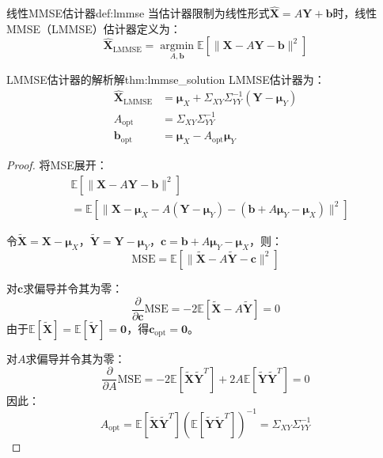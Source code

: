 \documentclass[11pt]{article}
\renewcommand{\vec}[1]{\bm{#1}}
\newcommand{\E}{\mathbb{E}}
\newcommand{\argmin}{\operatorname*{argmin}}
\begin{document}
\begin{definition}{线性MMSE估计器}{def:lmmse}
当估计器限制为线性形式$\hat{\vec{X}} = A\vec{Y} + \vec{b}$时，线性MMSE（LMMSE）估计器定义为：
\begin{equation}
\hat{\vec{X}}_{\text{LMMSE}} = \argmin_{A, \vec{b}} \E\left[ \|\vec{X} - A\vec{Y} - \vec{b}\|^2 \right]
\end{equation}
\end{definition}

\begin{theorem}{LMMSE估计器的解析解}{thm:lmmse_solution}
LMMSE估计器为：
\begin{align}
\hat{\vec{X}}_{\text{LMMSE}} &= \vec{\mu}_X + \Sigma_{XY} \Sigma_{YY}^{-1} (\vec{Y} - \vec{\mu}_Y) \\
A_{\text{opt}} &= \Sigma_{XY} \Sigma_{YY}^{-1} \\
\vec{b}_{\text{opt}} &= \vec{\mu}_X - A_{\text{opt}} \vec{\mu}_Y
\end{align}
\end{theorem}

\begin{proof}
将MSE展开：
\begin{align}
&\E[\|\vec{X} - A\vec{Y} - \vec{b}\|^2] \\
&= \E[\|\vec{X} - \vec{\mu}_X - A(\vec{Y} - \vec{\mu}_Y) - (\vec{b} + A\vec{\mu}_Y - \vec{\mu}_X)\|^2]
\end{align}

令$\tilde{\vec{X}} = \vec{X} - \vec{\mu}_X$，$\tilde{\vec{Y}} = \vec{Y} - \vec{\mu}_Y$，$\vec{c} = \vec{b} + A\vec{\mu}_Y - \vec{\mu}_X$，则：
\begin{equation}
\text{MSE} = \E[\|\tilde{\vec{X}} - A\tilde{\vec{Y}} - \vec{c}\|^2]
\end{equation}

对$\vec{c}$求偏导并令其为零：
\begin{equation}
\frac{\partial}{\partial \vec{c}} \text{MSE} = -2\E[\tilde{\vec{X}} - A\tilde{\vec{Y}}] = 0
\end{equation}
由于$\E[\tilde{\vec{X}}] = \E[\tilde{\vec{Y}}] = \vec{0}$，得$\vec{c}_{\text{opt}} = \vec{0}$。

对$A$求偏导并令其为零：
\begin{equation}
\frac{\partial}{\partial A} \text{MSE} = -2\E[\tilde{\vec{X}}\tilde{\vec{Y}}^T] + 2A\E[\tilde{\vec{Y}}\tilde{\vec{Y}}^T] = 0
\end{equation}
因此：
\begin{equation}
A_{\text{opt}} = \E[\tilde{\vec{X}}\tilde{\vec{Y}}^T] (\E[\tilde{\vec{Y}}\tilde{\vec{Y}}^T])^{-1} = \Sigma_{XY} \Sigma_{YY}^{-1}
\end{equation}
\end{proof}
\end{document}
